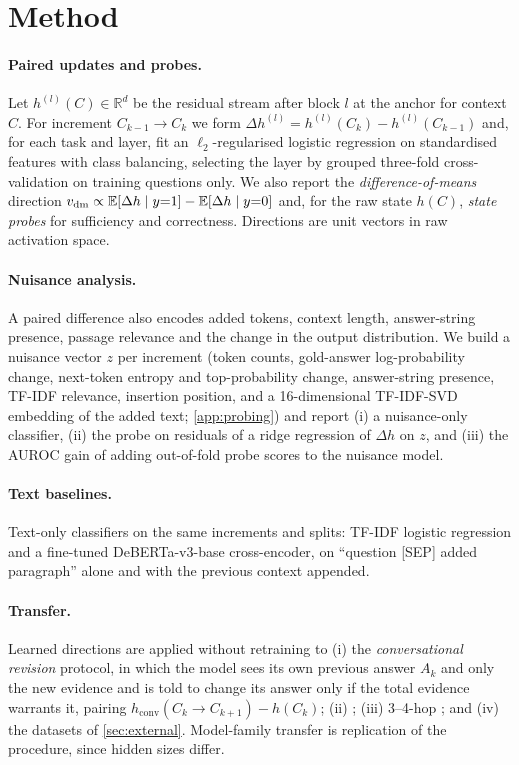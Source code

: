 \section{Method}
\label{sec:method}

\paragraph{Paired updates and probes.}
Let $h^{(l)}(C)\in\mathbb R^{d}$ be the residual stream after block $l$ at the anchor for context $C$. For increment $C_{k-1}\to C_k$ we form $\Delta h^{(l)}=h^{(l)}(C_k)-h^{(l)}(C_{k-1})$ and, for each task and layer, fit an $\ell_2$-regularised logistic regression on standardised features with class balancing, selecting the layer by grouped three-fold cross-validation on training questions only. We also report the \emph{difference-of-means} direction $v_{\mathrm{dm}}\propto\mathbb E[\Delta h\mid y{=}1]-\mathbb E[\Delta h\mid y{=}0]$ and, for the raw state $h(C)$, \emph{state probes} for sufficiency and correctness. Directions are unit vectors in raw activation space.

\paragraph{Nuisance analysis.}
A paired difference also encodes added tokens, context length, answer-string presence, passage relevance and the change in the output distribution. We build a nuisance vector $z$ per increment (token counts, gold-answer log-probability change, next-token entropy and top-probability change, answer-string presence, TF-IDF relevance, insertion position, and a 16-dimensional TF-IDF-SVD embedding of the added text; \cref{app:probing}) and report (i) a nuisance-only classifier, (ii) the probe on residuals of a ridge regression of $\Delta h$ on $z$, and (iii) the AUROC gain of adding out-of-fold probe scores to the nuisance model.

\paragraph{Text baselines.}
Text-only classifiers on the same increments and splits: TF-IDF logistic regression and a fine-tuned DeBERTa-v3-base cross-encoder, on ``question [SEP] added paragraph'' alone and with the previous context appended.

\paragraph{Transfer.}
Learned directions are applied without retraining to (i) the \emph{conversational revision} protocol, in which the model sees its own previous answer $A_k$ and only the new evidence and is told to change its answer only if the total evidence warrants it, pairing $h_{\text{conv}}(C_k\to C_{k+1})-h(C_k)$; (ii) \twowiki{}; (iii) 3--4-hop \musique{}; and (iv) the datasets of \cref{sec:external}. Model-family transfer is replication of the procedure, since hidden sizes differ.

